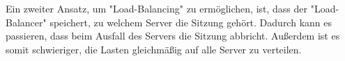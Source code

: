 Ein zweiter Ansatz, um "Load-Balancing" zu ermöglichen, ist, dass der "Load-Balancer" speichert, zu welchem Server die Sitzung gehört. Dadurch kann es passieren, dass beim Ausfall des Servers die Sitzung abbricht. Außerdem ist es somit schwieriger, die Lasten gleichmäßig auf alle Server zu verteilen.



\clearpage


